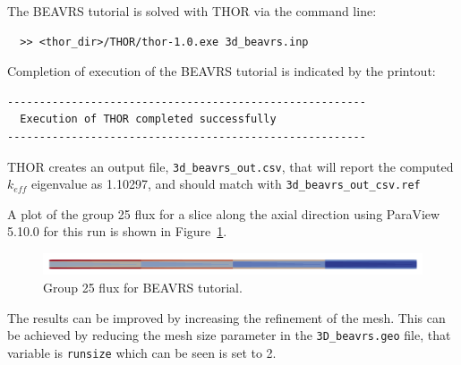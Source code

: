 The BEAVRS tutorial is solved with \ac{THOR} via the command line:
\begin{verbatim}
  >> <thor_dir>/THOR/thor-1.0.exe 3d_beavrs.inp
\end{verbatim}

Completion of execution of the BEAVRS tutorial is indicated by the printout:
\begin{verbatim}
--------------------------------------------------------
  Execution of THOR completed successfully
--------------------------------------------------------
\end{verbatim}

\ac{THOR} creates an output file, \verb"3d_beavrs_out.csv", that will report the computed $k_{eff}$ eigenvalue as 1.10297, and should match with \verb"3d_beavrs_out_csv.ref"

A plot of the group 25 flux for a slice along the axial direction using ParaView 5.10.0 for this run is shown in Figure~\ref{fig:beavrs_3d_g=25}.
\begin{figure}[th]
  \center
  \includegraphics[width=1.0\textwidth]{chapters/tutorials/figures/beavrs_3d_g=25.png}
  \caption{Group 25 flux for BEAVRS tutorial.}
  \label{fig:beavrs_3d_g=25}
\end{figure}

The results can be improved by increasing the refinement of the mesh.
This can be achieved by reducing the mesh size parameter in the \verb"3D_beavrs.geo" file, that variable is \verb"runsize" which can be seen is set to 2.